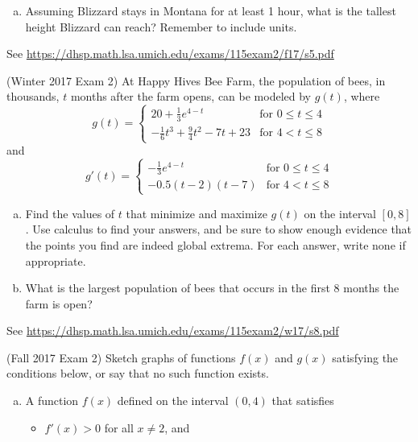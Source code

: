 \documentclass[11pt]{exam}
\begin{document}
\begin{questions}
\begin{enumerate}[(a)]
\item Assuming Blizzard stays in Montana for at least 1 hour, what is the tallest height Blizzard can reach? Remember to include units.
\end{enumerate}
\begin{solution}
  See \href{https://dhsp.math.lsa.umich.edu/exams/115exam2/f17/s5.pdf}{https://dhsp.math.lsa.umich.edu/exams/115exam2/f17/s5.pdf}
\end{solution}
\question (Winter 2017 Exam 2) %
At Happy Hives Bee Farm, the population of bees, in thousands, $t$ months after the farm opens, can be modeled by $g(t)$, where
$$g(t) = \displaystyle\left\lbrace \begin{array}{ll} 20 + \displaystyle\frac{1}{3} e^{4-t} & \textrm{for } 0 \leqslant t \leqslant 4 \\  -\displaystyle\frac{1}{6}t^3  + \displaystyle\frac{9}{4} t^2 - 7 t + 23 & \textrm{for } 4 < t \leqslant 8 \end{array} \right.$$
and
$$g'(t) = \displaystyle\left\lbrace \begin{array}{ll} -\displaystyle\frac{1}{3} e^{4-t} & \textrm{for } 0 \leqslant t \leqslant 4 \\  -0.5(t-2)(t-7) & \textrm{for } 4 < t \leqslant 8 \end{array} \right.$$
\begin{enumerate}[(a)]
\item Find the values of $t$ that minimize and maximize $g(t)$ on the interval $[0, 8]$. Use calculus to find your answers, and be sure to show enough evidence that the points you find are indeed global extrema. For each answer, write none if appropriate.
\item What is the largest population of bees that occurs in the first
  8 months the farm is open?
\end{enumerate}
\begin{solution}
  See \href{https://dhsp.math.lsa.umich.edu/exams/115exam2/w17/s8.pdf}{https://dhsp.math.lsa.umich.edu/exams/115exam2/w17/s8.pdf}
\end{solution}
\pagebreak
\question (Fall 2017 Exam 2) %
  Sketch graphs of functions $f(x)$ and $g(x)$ satisfying the conditions below, or say that no such function exists. 
	\begin{enumerate}[(a)]
	\item A function $f(x)$ defined on the interval $(0,4)$ that satisfies 
	\begin{itemize}
	\item $f'(x) > 0$ for all $x \neq 2$, and

\end{itemize}
\end{enumerate}
\end{questions}
\end{document}
